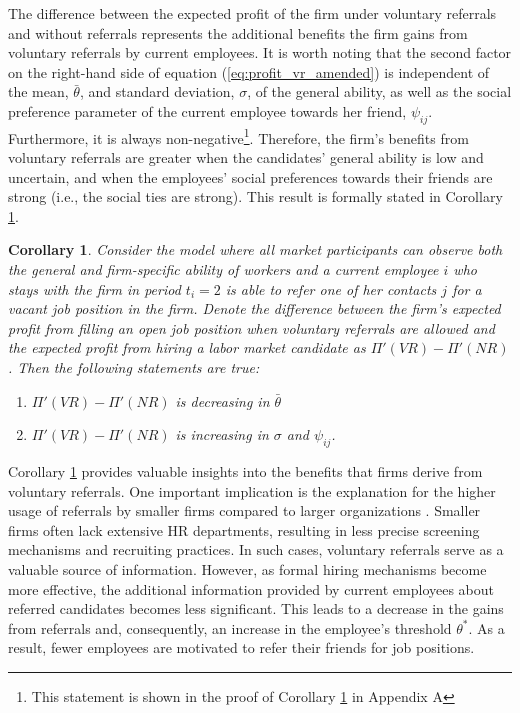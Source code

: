 \documentclass[12pt]{article}
\newtheorem{corollary}[theorem]{Corollary}
\begin{document}
The difference between the expected profit of the firm under voluntary referrals and without referrals represents the additional benefits the firm gains from voluntary referrals by current employees. It is worth noting that the second factor on the right-hand side of equation (\ref{eq:profit_vr_amended}) is independent of the mean, $\bar{\theta}$, and standard deviation, $\sigma$, of the general ability, as well as the social preference parameter of the current employee towards her friend, $\psi_{ij}$. Furthermore, it is always non-negative\footnote{This statement is shown in the proof of Corollary \ref{cor:profit_vr_amended} in Appendix A}. Therefore, the firm's benefits from voluntary referrals are greater when the candidates' general ability is low and uncertain, and when the employees' social preferences towards their friends are strong (i.e., the social ties are strong). This result is formally stated in Corollary \ref{cor:profit_vr_amended}.
\begin{corollary}\label{cor:profit_vr_amended}
   Consider the model where all market participants can observe both the general and firm-specific ability of workers and a current employee $i$ who stays with the firm in period $t_i = 2$ is able to refer one of her contacts $j$ for a vacant job position in the firm. Denote the difference between the firm’s expected profit from filling an open job position when voluntary referrals are allowed and the expected profit from hiring a labor market candidate as $\Pi'(VR) - \Pi'(NR)$. Then the following statements are true:
    \begin{enumerate}[label={\roman*})]
        \item $\Pi'(VR) - \Pi'(NR)$ is decreasing in $\bar{\theta}$
        \item $\Pi'(VR) - \Pi'(NR)$ is increasing in $\sigma$ and $\psi_{ij}$.
    \end{enumerate}
\end{corollary}

Corollary \ref{cor:profit_vr_amended} provides valuable insights into the benefits that firms derive from voluntary referrals. One important implication is the explanation for the higher usage of referrals by smaller firms compared to larger organizations \citep{marsden2001social}. Smaller firms often lack extensive HR departments, resulting in less precise screening mechanisms and recruiting practices. In such cases, voluntary referrals serve as a valuable source of information. However, as formal hiring mechanisms become more effective, the additional information provided by current employees about referred candidates becomes less significant. This leads to a decrease in the gains from referrals and, consequently, an increase in the employee's threshold $\theta^*$. As a result, fewer employees are motivated to refer their friends for job positions. 
\end{document}
